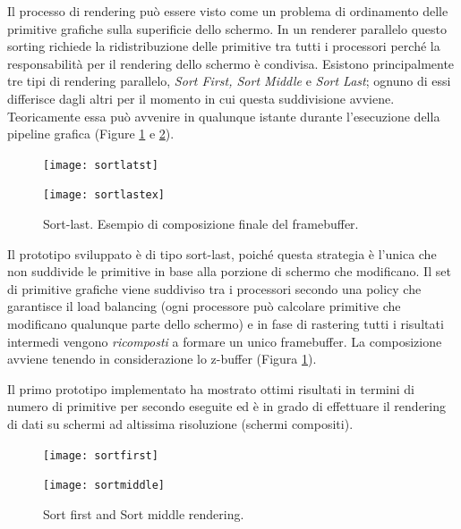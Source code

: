 \documentclass[a4paper,11pt]{paper}
\begin{document}
Il processo di rendering può essere visto come un problema di ordinamento delle primitive grafiche sulla superificie dello schermo. In un renderer parallelo questo sorting richiede la ridistribuzione delle primitive tra tutti i processori perché la responsabilità per il rendering dello schermo è condivisa.
Esistono principalmente tre tipi di rendering parallelo, \textit{Sort First, Sort Middle} e \textit{Sort Last}; ognuno di essi differisce dagli altri per il momento in cui questa suddivisione avviene. Teoricamente essa può avvenire in qualunque istante durante l'esecuzione della pipeline grafica (Figure \ref{fig:sl} e \ref{fig:sfsm}).


\begin{figure}
  \centering
  \begin{minipage}{0.4\textwidth}
    \texttt{[image: sortlatst]}
    \label{fig:sf}
  \end{minipage}
  \hfill
  \begin{minipage}{0.5\textwidth}
    \texttt{[image: sortlastex]}
  \end{minipage}
    \caption{Sort-last. Esempio di composizione finale del framebuffer.}\label{fig:sl}
\end{figure}

Il prototipo sviluppato è di tipo sort-last, poiché questa strategia è l'unica che non suddivide le primitive in base alla porzione di schermo che modificano.
Il set di primitive grafiche viene suddiviso tra i processori secondo una policy che garantisce il load balancing (ogni processore può calcolare primitive che modificano qualunque parte dello schermo) e in fase di rastering tutti i risultati intermedi vengono \textit{ricomposti} a formare un unico framebuffer. La composizione avviene tenendo in considerazione lo z-buffer (Figura \ref{fig:sl}).

Il primo prototipo implementato ha mostrato ottimi risultati in termini di numero di primitive per secondo eseguite ed è in grado di effettuare il rendering di dati su schermi ad altissima risoluzione (schermi compositi). 



\begin{figure}
  \centering
  \begin{minipage}{0.4\textwidth}
    \texttt{[image: sortfirst]}      
    \label{fig:sf}
  \end{minipage}
  \hfill
  \begin{minipage}{0.4\textwidth}
    \texttt{[image: sortmiddle]}
   \label{fig:sm}
  \end{minipage}
    \caption{Sort first and Sort middle rendering.}\label{fig:sfsm}
\end{figure}
\end{document}
